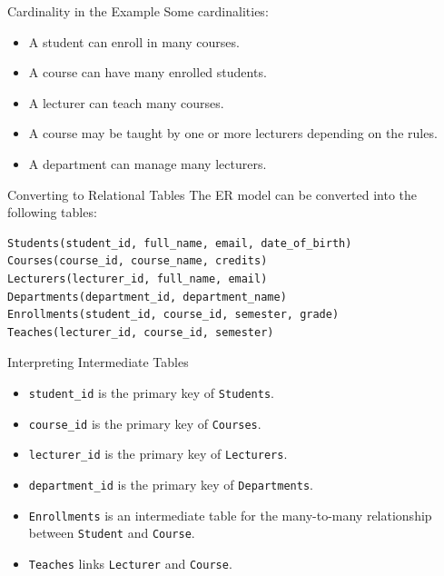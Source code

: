 \documentclass[aspectratio=169,11pt]{beamer}
\newcommand{\smallitem}{\setlength{\itemsep}{2pt}\setlength{\parskip}{0pt}}
\begin{document}
\begin{frame}{Cardinality in the Example}
\small
Some cardinalities:
\begin{itemize}
\smallitem
  \item A student can enroll in many courses.
  \item A course can have many enrolled students.
  \item A lecturer can teach many courses.
  \item A course may be taught by one or more lecturers depending on the rules.
  \item A department can manage many lecturers.
\end{itemize}
\end{frame}

\begin{frame}[fragile]{Converting to Relational Tables}
\small
The ER model can be converted into the following tables:
\begin{verbatim}
Students(student_id, full_name, email, date_of_birth)
Courses(course_id, course_name, credits)
Lecturers(lecturer_id, full_name, email)
Departments(department_id, department_name)
Enrollments(student_id, course_id, semester, grade)
Teaches(lecturer_id, course_id, semester)
\end{verbatim}
\end{frame}

\begin{frame}{Interpreting Intermediate Tables}
\small
\begin{itemize}
\smallitem
  \item \texttt{student\_id} is the primary key of \texttt{Students}.
  \item \texttt{course\_id} is the primary key of \texttt{Courses}.
  \item \texttt{lecturer\_id} is the primary key of \texttt{Lecturers}.
  \item \texttt{department\_id} is the primary key of \texttt{Departments}.
  \item \texttt{Enrollments} is an intermediate table for the many-to-many relationship between \texttt{Student} and \texttt{Course}.
  \item \texttt{Teaches} links \texttt{Lecturer} and \texttt{Course}.
\end{itemize}
\end{frame}
\end{document}
